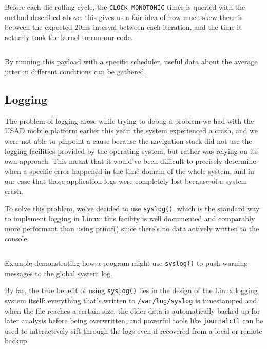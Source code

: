 \documentclass[a4paper,12pt]{report}
\begin{document}
Before each die-rolling cycle, the \texttt{CLOCK\_MONOTONIC} timer is queried with the method described above: this gives us a fair idea of how much skew there is between the expected 20ms interval between each iteration, and the time it actually took the kernel to run our code.

\begin{listing}[H]
\inputminted[frame=single,framesep=10pt]{c}{snippets/latency-test.c}
\caption{By running this payload with a specific scheduler, useful data about the average jitter in different conditions can be gathered.}
\end{listing}



\subsection{Logging}

The problem of logging arose while trying to debug a problem we had with the USAD mobile platform earlier this year: the system experienced a crash, and we were not able to pinpoint a cause because the navigation stack did not use the logging facilities provided by the operating system, but rather was relying on its own approach. This meant that it would've been difficult to precisely determine when a specific error happened in the time domain of the whole system, and in our case that those application logs were completely lost because of a system crash.

To solve this problem, we've decided to use \texttt{syslog()}, which is the standard way to implement logging in Linux: this facility is well documented and comparably more performant than using printf() since there's no data actively written to the console.

\begin{listing}[H]
\inputminted[frame=single,framesep=10pt]{c}{snippets/syslog-example.c}
\caption{Example demonstrating how a program might use \texttt{syslog()} to push warning messages to the global system log.}
\end{listing}

By far, the true benefit of using \texttt{syslog()} lies in the design of the Linux logging system itself: everything that's written to \texttt{/var/log/syslog} is timestamped and, when the file reaches a certain size, the older data is automatically backed up for later analysis before being overwritten, and powerful tools like \texttt{journalctl} can be used to interactively sift through the logs even if recovered from a local or remote backup.
\end{document}
